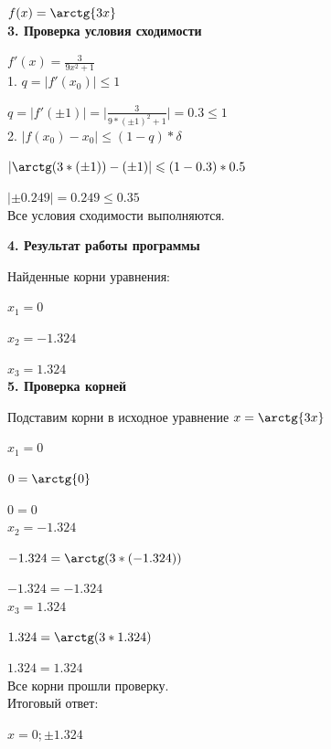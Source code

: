 \documentclass[oneside,final,14pt]{extreport}
\begin{document}
$f(x) = \arctg{3x}$\\


{\bfseries 3. Проверка условия сходимости}

$f'(x) = \frac{\displaystyle 3}{\displaystyle 9x^2 + 1}$\\

1. $q = \lvert f'(x_0) \rvert \leqslant 1$

\hspace{5.3mm}$q = \lvert f'(\pm 1) \rvert = \bigg | \frac{\displaystyle 3}{\displaystyle 9 * (\pm 1)^2 + 1} \bigg | = 0.3 \leqslant 1$\\

2. $\lvert f(x_0) - x_0 \rvert \leqslant (1 - q) * \delta$

\hspace{5.3mm}$\lvert \arctg(3 * (\pm 1)) - (\pm 1) \rvert \leqslant (1 - 0.3) * 0.5$

\hspace{5.3mm}$\lvert \pm 0.249 \rvert = 0.249 \leqslant 0.35$\\

Все условия сходимости выполняются.


{\bfseries 4. Результат работы программы}

Найденные корни уравнения:

$x_1 = 0$

$x_2 = -1.324$

$x_3 = 1.324$\\


{\bfseries 5. Проверка корней}

Подставим корни в исходное уравнение $x = \arctg{3x}$

$x_1 = 0$

$0 = \arctg{0}$

$0 = 0$\\

$x_2 = -1.324$

$-1.324 = \arctg(3 * (-1.324))$

$-1.324 = -1.324$\\

$x_3 = 1.324$

$1.324 = \arctg(3 * 1.324)$

$1.324 = 1.324$\\

Все корни прошли проверку.\\

Итоговый ответ:

$x = 0; \pm 1.324$
\end{document}
